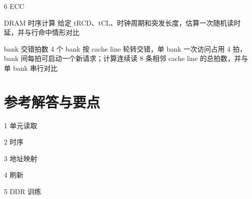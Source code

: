 \begin{chapterexercise}{6}
ECC
\end{chapterexercise}

\begin{chapterexercise}{DRAM 时序计算}
给定 tRCD、tCL、时钟周期和突发长度，估算一次随机读时延，并与行命中情形对比
\end{chapterexercise}

\begin{chapterexercise}{bank 交错拍数}
4 个 bank 按 cache line 轮转交错，单 bank 一次访问占用 4 拍，bank 间每拍可启动一个新请求；计算连续读 8 条相邻 cache line 的总拍数，并与单 bank 串行对比
\end{chapterexercise}

\section*{参考解答与要点}

\begin{chapteranswer}{1}
单元读取
\end{chapteranswer}

\begin{chapteranswer}{2}
时序
\end{chapteranswer}

\begin{chapteranswer}{3}
地址映射
\end{chapteranswer}

\begin{chapteranswer}{4}
刷新
\end{chapteranswer}

\begin{chapteranswer}{5}
DDR 训练
\end{chapteranswer}

